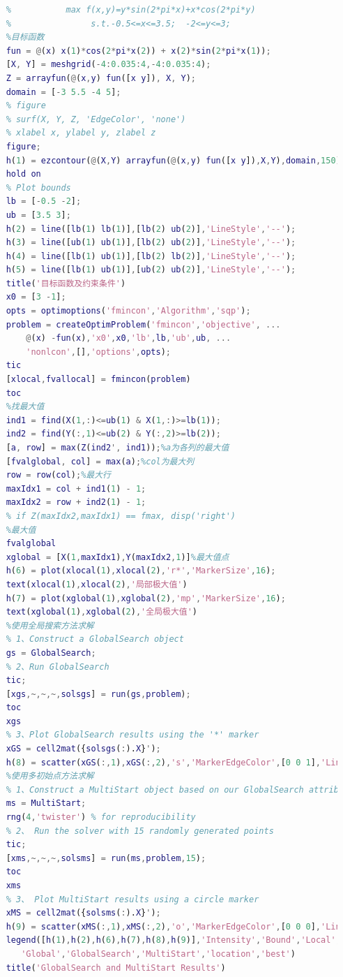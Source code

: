     \begin{lstlisting}[language = Matlab]
    %% 智能优化引例1:无约束
    %           max f(x,y)=y*sin(2*pi*x)+x*cos(2*pi*y)
    %                s.t.-0.5<=x<=3.5;  -2<=y<=3;
    %目标函数
    fun = @(x) x(1)*cos(2*pi*x(2)) + x(2)*sin(2*pi*x(1));
    [X, Y] = meshgrid(-4:0.035:4,-4:0.035:4);
    Z = arrayfun(@(x,y) fun([x y]), X, Y);
    domain = [-3 5.5 -4 5];
    % figure
    % surf(X, Y, Z, 'EdgeColor', 'none')
    % xlabel x, ylabel y, zlabel z
    figure;
    h(1) = ezcontour(@(X,Y) arrayfun(@(x,y) fun([x y]),X,Y),domain,150);
    hold on
    % Plot bounds
    lb = [-0.5 -2];
    ub = [3.5 3];
    h(2) = line([lb(1) lb(1)],[lb(2) ub(2)],'LineStyle','--');
    h(3) = line([ub(1) ub(1)],[lb(2) ub(2)],'LineStyle','--');
    h(4) = line([lb(1) ub(1)],[lb(2) lb(2)],'LineStyle','--');
    h(5) = line([lb(1) ub(1)],[ub(2) ub(2)],'LineStyle','--');
    title('目标函数及约束条件')
    x0 = [3 -1];
    opts = optimoptions('fmincon','Algorithm','sqp');
    problem = createOptimProblem('fmincon','objective', ...
        @(x) -fun(x),'x0',x0,'lb',lb,'ub',ub, ...
        'nonlcon',[],'options',opts);
    tic
    [xlocal,fvallocal] = fmincon(problem)
    toc
    %找最大值
    ind1 = find(X(1,:)<=ub(1) & X(1,:)>=lb(1));
    ind2 = find(Y(:,1)<=ub(2) & Y(:,2)>=lb(2));
    [a, row] = max(Z(ind2', ind1));%a为各列的最大值
    [fvalglobal, col] = max(a);%col为最大列
    row = row(col);%最大行
    maxIdx1 = col + ind1(1) - 1;
    maxIdx2 = row + ind2(1) - 1;
    % if Z(maxIdx2,maxIdx1) == fmax, disp('right')
    %最大值
    fvalglobal
    xglobal = [X(1,maxIdx1),Y(maxIdx2,1)]%最大值点
    h(6) = plot(xlocal(1),xlocal(2),'r*','MarkerSize',16);
    text(xlocal(1),xlocal(2),'局部极大值')
    h(7) = plot(xglobal(1),xglobal(2),'mp','MarkerSize',16);
    text(xglobal(1),xglobal(2),'全局极大值')
    %使用全局搜索方法求解
    % 1、Construct a GlobalSearch object
    gs = GlobalSearch;
    % 2、Run GlobalSearch
    tic;
    [xgs,~,~,~,solsgs] = run(gs,problem);
    toc
    xgs
    % 3、Plot GlobalSearch results using the '*' marker
    xGS = cell2mat({solsgs(:).X}');
    h(8) = scatter(xGS(:,1),xGS(:,2),'s','MarkerEdgeColor',[0 0 1],'LineWidth',1.25);
    %使用多初始点方法求解
    % 1、Construct a MultiStart object based on our GlobalSearch attributes
    ms = MultiStart;
    rng(4,'twister') % for reproducibility
    % 2、 Run the solver with 15 randomly generated points
    tic;
    [xms,~,~,~,solsms] = run(ms,problem,15);
    toc
    xms
    % 3、 Plot MultiStart results using a circle marker
    xMS = cell2mat({solsms(:).X}');
    h(9) = scatter(xMS(:,1),xMS(:,2),'o','MarkerEdgeColor',[0 0 0],'LineWidth',1.25);
    legend([h(1),h(2),h(6),h(7),h(8),h(9)],'Intensity','Bound','Local',...
       'Global','GlobalSearch','MultiStart','location','best')
    title('GlobalSearch and MultiStart Results')
    \end{lstlisting}
